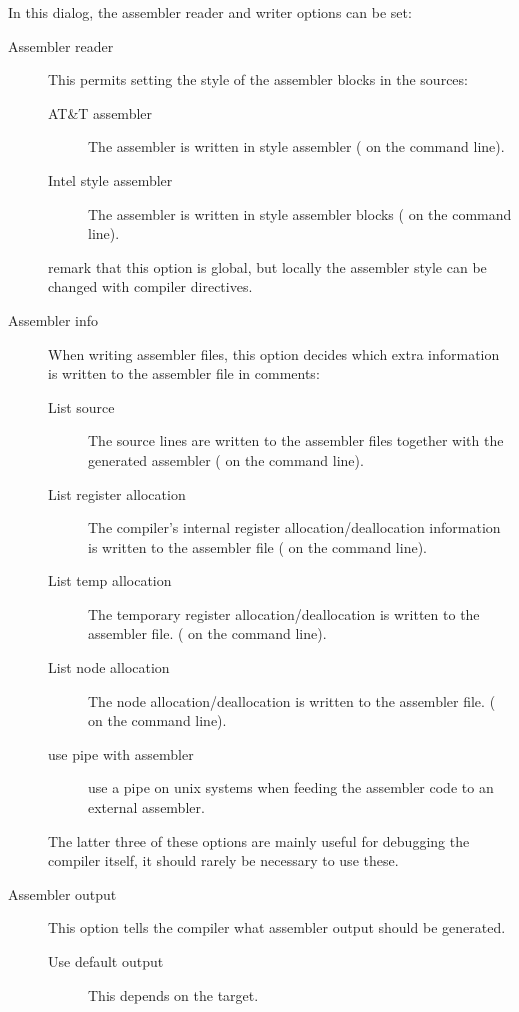 
In this dialog, the assembler reader and writer options can be set:
\begin{description}
\item[Assembler reader] This permits setting the style of the assembler blocks
in the sources:
\begin{description}
\item[AT\&T assembler] The assembler is written in  style
assembler ( on the command line).
\item[Intel style assembler] The assembler is written in  style
assembler blocks ( on the command line).
\end{description}
remark that this option is global, but locally the assembler style can be
changed with compiler directives.
\item[Assembler info] When writing assembler files, this option decides
which extra information is written to the assembler file in comments:
\begin{description}
\item[List source] The source lines are written to the assembler files
together with the generated assembler ( on the command line).
\item[List register allocation] The compiler's internal register
allocation/deallocation information is written to the assembler file
( on the command line).
\item[List temp allocation] The temporary register allocation/deallocation
is written to the assembler file. ( on the command line).
\item[List node allocation] The node allocation/deallocation
is written to the assembler file. ( on the command line).
\item[use pipe with assembler] use a pipe on unix systems when feeding the
assembler code to an external assembler.
\end{description}
The latter three of these options are mainly useful for debugging the
compiler itself, it should rarely be necessary to use these.
\item[Assembler output] This option tells the compiler what assembler output
should be generated.
\begin{description}
\item[Use default output] This depends on the target.

\end{description}
\end{description}
